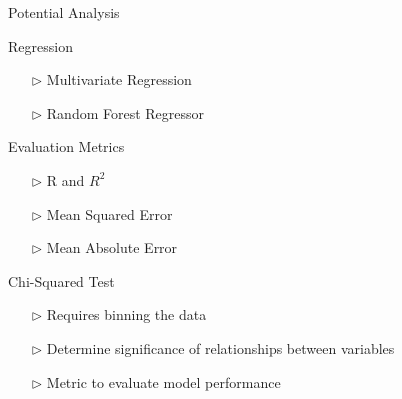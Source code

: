 \documentclass[10pt]{beamer}
\begin{document}
\begin{frame}[fragile]{Potential Analysis}
    \begin{exampleblock}{Regression}

        \begin{itemize}
            \item[$\triangleright$] Multivariate Regression
            \item[$\triangleright$] Random Forest Regressor
        \end{itemize}
    \end{exampleblock}
\vspace{1em}
    \begin{exampleblock}{Evaluation Metrics}
        \begin{itemize}
            \item[$\triangleright$] R and $R^{2}$
            \item[$\triangleright$] Mean Squared Error
            \item[$\triangleright$] Mean Absolute Error
        \end{itemize}
    \end{exampleblock}

    \vspace{1em}


    \begin{exampleblock}{Chi-Squared Test}
        \begin{itemize}
            \item[$\triangleright$] Requires binning the data
            \item[$\triangleright$] Determine significance of relationships between variables
            \item[$\triangleright$] Metric to evaluate model performance
        \end{itemize}
    \end{exampleblock}
\end{frame}
\end{document}
